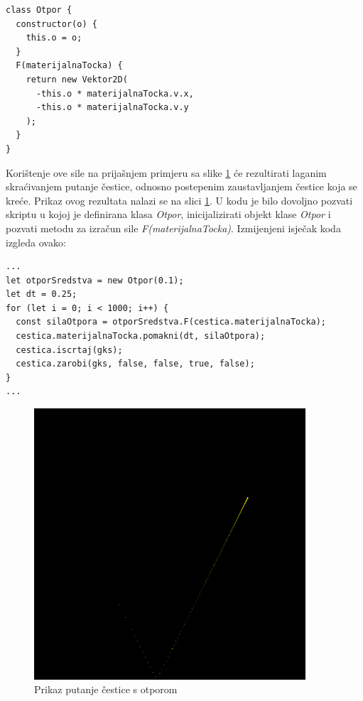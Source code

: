 \documentclass{foi}
\begin{document}
\begin{verbatim}
class Otpor {
  constructor(o) {
    this.o = o;
  }
  F(materijalnaTocka) {
    return new Vektor2D(
      -this.o * materijalnaTocka.v.x,
      -this.o * materijalnaTocka.v.y
    );
  }
}
\end{verbatim}
Korištenje ove sile na prijašnjem primjeru sa slike \ref{fig:PutanjaCesticeSOtporom} će rezultirati laganim skraćivanjem putanje čestice, odnosno postepenim zaustavljanjem čestice koja se kreće. Prikaz ovog rezultata nalazi se na slici \ref{fig:PutanjaCesticeSOtporom}. U kodu je bilo dovoljno pozvati skriptu u kojoj je definirana klasa \textit{Otpor}, inicijalizirati objekt klase \textit{Otpor} i pozvati metodu za izračun sile \textit{F(materijalnaTocka)}. Izmijenjeni isječak koda izgleda ovako:

\begin{verbatim}
...
let otporSredstva = new Otpor(0.1);
let dt = 0.25;
for (let i = 0; i < 1000; i++) {
  const silaOtpora = otporSredstva.F(cestica.materijalnaTocka);
  cestica.materijalnaTocka.pomakni(dt, silaOtpora);
  cestica.iscrtaj(gks);
  cestica.zarobi(gks, false, false, true, false);
}
...
\end{verbatim}
\begin{figure}[H]
    \centering
    \includegraphics[width=0.9\textwidth]{slike/11_PutanjaCesticeSOtporom.png}
    \captionsetup{justification=centering}
    \caption{Prikaz putanje čestice s otporom}
\label{fig:PutanjaCesticeSOtporom}
\end{figure}
\end{document}
